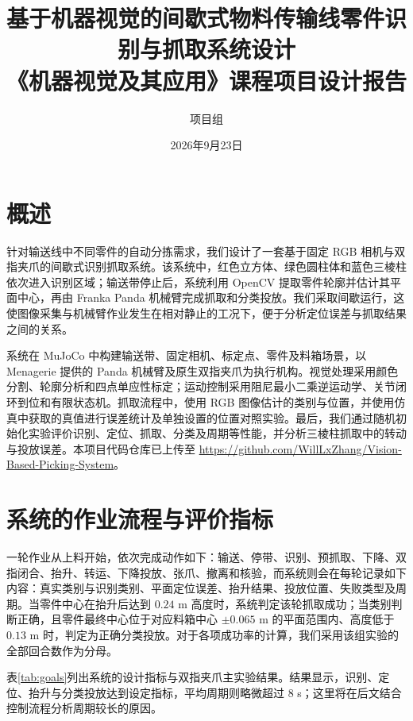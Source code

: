 \documentclass[UTF8,a4paper,11pt,fontset=windows]{ctexart}
\title{\vspace{2.6cm}\Huge 基于机器视觉的间歇式物料传输线零件识别与抓取系统设计\\[0.8cm]
\Large 《机器视觉及其应用》课程项目设计报告}
\author{项目组}
\date{2026年9月23日}
\begin{document}
\pagestyle{plain}
\maketitle
\fontsize{12pt}{17.5pt}\selectfont
\thispagestyle{empty}
\vfill
\clearpage
\begingroup
\fontsize{13pt}{19pt}\selectfont
\tableofcontents
\endgroup
\clearpage

\section{概述}
针对输送线中不同零件的自动分拣需求，我们设计了一套基于固定 RGB 相机与双指夹爪的间歇式识别抓取系统。该系统中，红色立方体、绿色圆柱体和蓝色三棱柱依次进入识别区域；输送带停止后，系统利用 OpenCV 提取零件轮廓并估计其平面中心，再由 Franka Panda 机械臂完成抓取和分类投放。我们采取间歇运行，这使图像采集与机械臂作业发生在相对静止的工况下，便于分析定位误差与抓取结果之间的关系。

系统在 MuJoCo 中构建输送带、固定相机、标定点、零件及料箱场景，以 Menagerie 提供的 Panda 机械臂及原生双指夹爪为执行机构\cite{menagerie,panda}。视觉处理采用颜色分割、轮廓分析和四点单应性标定；运动控制采用阻尼最小二乘逆运动学、关节闭环到位和有限状态机。抓取流程中，使用 RGB 图像估计的类别与位置，并使用仿真中获取的真值进行误差统计及单独设置的位置对照实验。最后，我们通过随机初始化实验评价识别、定位、抓取、分类及周期等性能，并分析三棱柱抓取中的转动与投放误差。本项目代码仓库已上传至 \url{https://github.com/WillLxZhang/Vision-Based-Picking-System}。

\section{系统的作业流程与评价指标}
一轮作业从上料开始，依次完成动作如下：输送、停带、识别、预抓取、下降、双指闭合、抬升、转运、下降投放、张爪、撤离和核验，而系统则会在每轮记录如下内容：真实类别与识别类别、平面定位误差、抬升结果、投放位置、失败类型及周期。当零件中心在抬升后达到 $0.24$ m 高度时，系统判定该轮抓取成功；当类别判断正确，且零件最终中心位于对应料箱中心 $\pm0.065$ m 的平面范围内、高度低于 $0.13$ m 时，判定为正确分类投放。对于各项成功率的计算，我们采用该组实验的全部回合数作为分母。

表\ref{tab:goals}列出系统的设计指标与双指夹爪主实验结果。结果显示，识别、定位、抬升与分类投放达到设定指标，平均周期则略微超过 $8$ s；这里将在后文结合控制流程分析周期较长的原因。
\enlargethispage{3\baselineskip}
\end{document}
